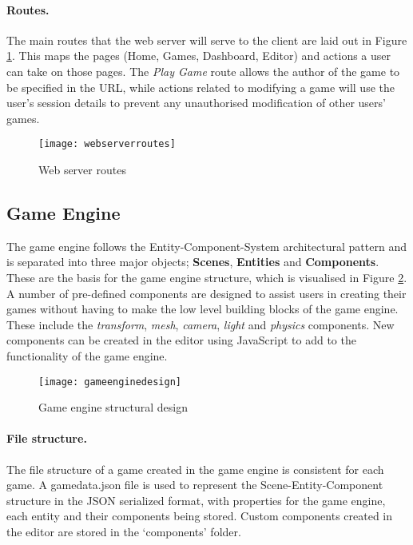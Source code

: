 
	\paragraph{Routes.}
	The main routes that the web server will serve to the client are laid out in Figure \ref{fig:webserverroutes}. This maps the pages (Home, Games, Dashboard, Editor) and actions a user can take on those pages. The \emph{Play Game} route allows the author of the game to be specified in the URL, while actions related to modifying a game will use the user's session details to prevent any unauthorised modification of other users' games.

	\begin{figure}[h]
		\centering
		\texttt{[image: webserverroutes]}
		\caption{Web server routes}
		\label{fig:webserverroutes}
	\end{figure}

	\subsection{Game Engine}
	The game engine follows the Entity-Component-System architectural pattern and is separated into three major objects; \textbf{Scenes}, \textbf{Entities} and \textbf{Components}. These are the basis for the game engine structure, which is visualised in Figure \ref{fig:gameenginedesign}. A number of pre-defined components are designed to assist users in creating their games without having to make the low level building blocks of the game engine. These include the \emph{transform}, \emph{mesh}, \emph{camera}, \emph{light} and \emph{physics} components. New components can be created in the editor using JavaScript to add to the functionality of the game engine.


	\begin{figure}[h]
		\centering
		\texttt{[image: gameenginedesign]}
		\caption{Game engine structural design}
		\label{fig:gameenginedesign}
	\end{figure}

	\paragraph{File structure.}
	The file structure of a game created in the game engine is consistent for each game. A gamedata.json file is used to represent the Scene-Entity-Component structure in the JSON serialized format, with properties for the game engine, each entity and their components being stored. Custom components created in the editor are stored in the `components' folder.

